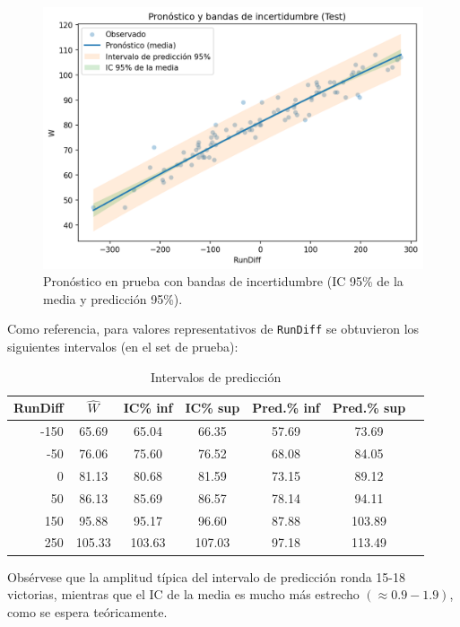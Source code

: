 \documentclass[man,floatsintext]{apa7}
\begin{document}
\begin{figure}[H]
    \centering
    \includegraphics[width=.85\linewidth]{../plots/forecast_intervals_vs_rundiff_test.png}
    \caption{Pronóstico en prueba con bandas de incertidumbre (IC 95\% de la media y predicción 95\%).}
    \label{fig:forecast_bands}
\end{figure}

Como referencia, para valores representativos de \texttt{RunDiff} se obtuvieron los siguientes intervalos (en el set de prueba):

\begin{table}[H]
    \centering
    \caption{Intervalos de predicción}
    \label{tab:pred_intervals}
    \begin{tabular}{rcccccc}
      \toprule
      RunDiff & $\hat{W}$ & IC\;95\% inf & IC\;95\% sup & Pred.\;95\% inf & Pred.\;95\% sup \\
      \midrule
      -150 & 65.69 & 65.04 & 66.35 & 57.69 & 73.69 \\
       -50 & 76.06 & 75.60 & 76.52 & 68.08 & 84.05 \\
         0 & 81.13 & 80.68 & 81.59 & 73.15 & 89.12 \\
        50 & 86.13 & 85.69 & 86.57 & 78.14 & 94.11 \\
       150 & 95.88 & 95.17 & 96.60 & 87.88 & 103.89 \\
       250 & 105.33 & 103.63 & 107.03 & 97.18 & 113.49 \\
      \bottomrule
    \end{tabular}
  \end{table}
  
Obsérvese que la amplitud típica del intervalo de predicción ronda 15-18 victorias, mientras que el IC de la media es mucho más estrecho $(\approx0.9-1.9)$, como se espera teóricamente.
\end{document}

